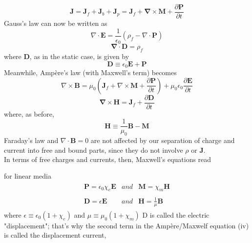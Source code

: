 $$\mathbf{J}=\mathbf{J}_{f}+\mathbf{J}_{b}+\mathbf{J}_{p}=\mathbf{J}_{f}+\mathbf{\nabla} \times \mathbf{M}+\frac{\partial \mathbf{P}}{\partial t}$$ Gauss's law can now be written as $$\nabla \cdot \mathbf{E}=\frac{1}{\epsilon_{0}}\left(\rho_{f}-\nabla \cdot \mathbf{P}\right)$$ $$\boldsymbol{\nabla} \cdot \mathbf{D}=\rho_{f}$$ where $\mathbf{D}$, as in the static case, is given by $$\mathbf{D} \equiv \epsilon_{0} \mathbf{E}+\mathbf{P}$$ Meanwhile, Ampère's law (with Maxwell's term) becomes $$\nabla \times \mathbf{B}=\mu_{0}\left(\mathbf{J}_{f}+\nabla \times \mathbf{M}+\frac{\partial \mathbf{P}}{\partial t}\right)+\mu_{0} \epsilon_{0} \frac{\partial \mathbf{E}}{\partial t}$$$$\boldsymbol{\nabla} \times \mathbf{H}=\mathbf{J}_{f}+\frac{\partial \mathbf{D}}{\partial t}$$ where, as before,$$\mathbf{H} \equiv \frac{1}{\mu_{0}} \mathbf{B}-\mathbf{M}$$ Faraday's law and $\nabla \cdot \mathbf{B}=0$ are not affected by our separation of charge and current into free and bound parts, since they do not involve $\rho$ or $\mathbf{J}$. \\
In terms of free charges and currents, then, Maxwell's equations read\
\begin{center}
\end{center}
for linear media
\begin{align*}
\begin{array}{lll}
\mathbf{P}=\epsilon_{0} \chi_{e} \mathbf{E} & and& \mathbf{M}=\chi_{m} \mathbf{H}\\\\
\mathbf{D}=\epsilon \mathbf{E}&and&\mathbf{H}=\frac{1}{\mu} \mathbf{B}
\end{array}
\end{align*}
where $\epsilon \equiv \epsilon_{0}\left(1+\chi_{e}\right)$ and $\mu \equiv \mu_{0}\left(1+\chi_{m}\right)$ D is called the electric "displacement"; that's why the second term in the Ampère/Maxwelf equation (iv) is called the displacement current,\\
